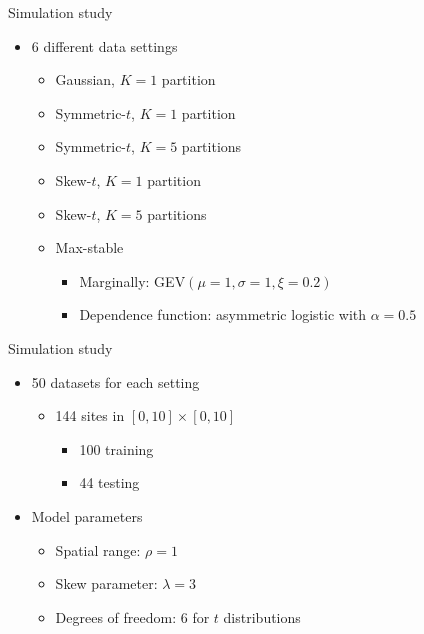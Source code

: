 \documentclass{beamer}
\begin{document}
\begin{frame}{Simulation study}
  \begin{itemize} \setlength{\itemsep}{1em}
    \item 6 different data settings
    \begin{itemize}
      \item Gaussian, $K = 1$ partition
      \item Symmetric-$t$, $K = 1$ partition
      \item Symmetric-$t$, $K = 5$ partitions
      \item Skew-$t$, $K = 1$ partition
      \item Skew-$t$, $K = 5$ partitions
      \item Max-stable
      \begin{itemize}
        \item Marginally: GEV$(\mu=1, \sigma=1, \xi=0.2)$
        \item Dependence function: asymmetric logistic with $\alpha = 0.5$
      \end{itemize}
    \end{itemize}
  \end{itemize}
\end{frame}

\begin{frame}{Simulation study}
  \begin{itemize} \setlength{\itemsep}{1em}
    \item 50 datasets for each setting
    \begin{itemize}
      \item 144 sites in $[0, 10] \times [0, 10]$
      \begin{itemize}
        \item 100 training
        \item 44 testing
      \end{itemize}
    \end{itemize}
    \item Model parameters
    \begin{itemize}
      \item Spatial range: $\rho = 1$
      \item Skew parameter: $\lambda = 3$
      \item Degrees of freedom: 6 for $t$ distributions
    \end{itemize}
  \end{itemize}
\end{frame}
\end{document}
